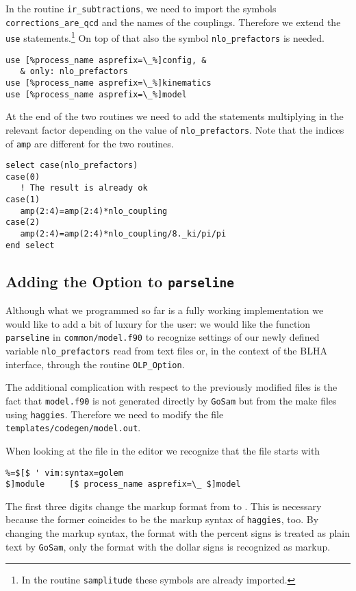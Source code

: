 \documentclass[11pt,a4paper]{refrep}
\newcommand{\golem}{{\tt GoSam}\xspace}
\newcommand{\haggies}{{\tt haggies}\xspace}
\begin{document}
In the routine \texttt{ir\_subtractions}, we need to import the
symbols \texttt{corrections\_are\_qcd} and the names of the
couplings. Therefore we extend the \texttt{use} statements.\footnote{
In the routine \texttt{samplitude} these symbols are already imported.}
On top of that also the symbol \texttt{nlo\_prefactors} is needed.
\begin{lstlisting}
use [%process_name asprefix=\_%]config, &
   & only: nlo_prefactors
use [%process_name asprefix=\_%]kinematics
use [%process_name asprefix=\_%]model
\end{lstlisting}

At the end of the two routines we need to add the statements
multiplying in the relevant factor depending on the value
of  \texttt{nlo\_prefactors}. 
Note that the indices of \texttt{amp} are different for the two routines.
\begin{lstlisting}
select case(nlo_prefactors)
case(0)
   ! The result is already ok
case(1)
   amp(2:4)=amp(2:4)*nlo_coupling
case(2)
   amp(2:4)=amp(2:4)*nlo_coupling/8._ki/pi/pi
end select
\end{lstlisting}

\subsection{Adding the Option to \texttt{parseline}}
Although what we programmed so far is a fully working implementation
we would like to add a bit of luxury for the user: we would like
the function \texttt{parseline} in \texttt{common/\hspace{0pt}model.f90}
to recognize settings of our newly defined variable \texttt{nlo\_prefactors}
read from text files or, in the context of the BLHA interface,
through the routine \texttt{OLP\_Option}.

The additional complication with respect to the previously modified
files is the fact that \texttt{model.f90} is not generated directly
by \golem{} but from the make files using \haggies{}. Therefore we
need to modify the file
\texttt{templates/\hspace{0pt}codegen\hspace{0pt}/model.out}.

When looking at the file in the editor we recognize that the file
starts with
\begin{lstlisting}
%=$[$ ' vim:syntax=golem
$]module     [$ process_name asprefix=\_ $]model
\end{lstlisting}
The first three digits \lit{\%=\$} change the markup format from
\lit{[\% ... \%]} to \lit{[\$ ... \$]}. This is necessary because
the former coincides to be the markup syntax of \haggies{}, too.
By changing the markup syntax, the format with the percent signs
is treated as plain text by \golem{}, only the format with the
dollar signs is recognized as markup.
\end{document}
